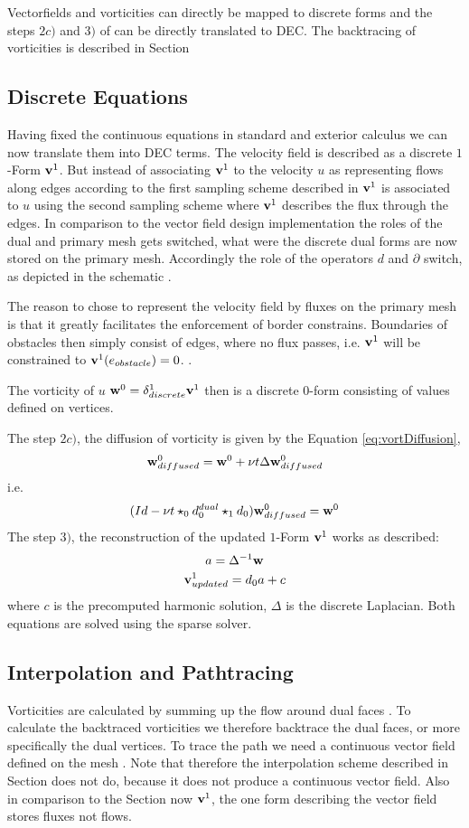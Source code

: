 Vectorfields and vorticities can directly be mapped to discrete forms and the steps $2 c)$ and $3)$ of  can be directly translated to DEC. The backtracing of vorticities is described in Section 

\subsection{Discrete Equations}
Having fixed the continuous equations in standard and exterior calculus we can now translate them into DEC terms. 
The velocity field is described as a discrete  $1$-Form $\textbf{v}^1$. But instead of associating $\textbf{v}^1$ to the velocity $u$ as representing flows along edges according to the first sampling scheme described in  $\textbf{v}^1$ is associated to $u$ using the second sampling scheme  where $\textbf{v}^1$ describes the flux through the edges. In comparison to the vector field design implementation the roles of the dual and primary mesh gets switched, what were the discrete dual forms are now stored on the primary mesh. Accordingly the role of the operators $d$ and $\partial$ switch, as depicted in the schematic .

The reason to chose to represent the velocity field by fluxes on the primary mesh is that it greatly facilitates the enforcement of border constrains. Boundaries of obstacles then simply consist of edges, where no flux passes, i.e. $\textbf{v}^1$ will be constrained to $\textbf{v}^1(e_{obstacle}) = 0$. .

The vorticity of $u$ $ \textbf{w}^0 = \delta_{discrete}^1 \textbf{v}^{1}$ then is  a discrete $0$-form consisting of values defined on vertices.

The step $2 c)$, the diffusion of vorticity is given by the Equation \ref{eq:vortDiffusion},
\[\textbf{w}^0_{diffused} = \textbf{w}^0 + \nu t \Delta \textbf{w}^0_{diffused}\]
i.e.
\[(Id - \nu t  \star_0 d^{dual}_0\star_1d_0)\textbf{w}^0_{diffused} = \textbf{w}^0\] 
The step $3)$, the reconstruction of the updated $1$-Form $\textbf{v}^1$ works as described:
\[a = \Delta^{-1} \textbf{w}\]
\[\textbf{v}^1_{updated} =  d_0a + c\]
where $c$ is the precomputed harmonic solution, $\Delta$ is the discrete Laplacian. Both equations are solved using the sparse solver.


\subsection{Interpolation and Pathtracing}
Vorticities are calculated by summing up the flow around dual faces . To calculate the backtraced vorticities we therefore backtrace the dual faces, or more specifically the dual vertices. To trace the path we need a continuous vector field defined on the mesh . Note that therefore the interpolation scheme described in Section  does not do, because it does not produce a continuous vector field. Also in comparison to the Section  now $\textbf{v}^1$, the one form describing the vector field stores fluxes not flows.


